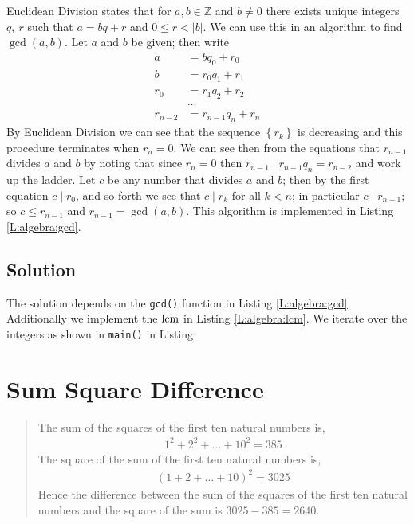 \documentclass[oneside,12pt]{book}   	%
\newcounter{ex}
\newcounter{pr}
\theoremstyle{definition}
\newcommand{\lcm}[1]{\mathrm{lcm }#1}
\newcommand{\set}[1]{\left\{#1\right\}}
\newcommand{\order}[1]{\left| #1 \right|}
\begin{document}
\begin{spacing}{1.618}
			Euclidean Division states that for $a,b\in\mathbb{Z}$ and $b\neq 0$ there exists unique integers $q,~r$ such that $a=bq+r$ and $0\leq r< \order{b}$. We can use this in an algorithm to find $\gcd{(a,b)}$. Let $a$ and $b$ be given; then write 
			\begin{alignat*}{4}
				a&=bq_0+r_0 \\
				b&=r_0q_1+r_1 \\
				r_0&=r_1q_2+r_2 \\
				&\dots \\
				r_{n-2}&=r_{n-1}q_n+r_n
			\end{alignat*}
			By Euclidean Division we can see that the sequence $\set{r_k}$ is decreasing and this procedure terminates when $r_n=0$. We can see then from the equations that $r_{n-1}$ divides $a$ and $b$ by noting that since $r_n=0$ then $r_{n-1}\mid r_{n-1}q_n=r_{n-2}$ and work up the ladder.  Let $c$ be any number that divides $a$ and $b$; then by the first equation $c\mid r_0$, and so forth we see that $c\mid r_k$ for all $k<n$; in particular $c\mid r_{n-1}$; so $c\leq r_{n-1}$ and $r_{n-1}=\gcd{(a,b)}$. This algorithm is implemented in Listing \ref{L:algebra:gcd}. 
			
			
			
		\section{Solution}
		
			
			The solution depends on the \texttt{gcd()} function in Listing \ref{L:algebra:gcd}. Additionally we implement the $\lcm$ in Listing \ref{L:algebra:lcm}. We iterate over the integers as shown in \texttt{main()} in Listing 
			
			
	
	\chapter{Sum Square Difference}
	
		\begin{quote}
			The sum of the squares of the first ten natural numbers is,
			\begin{alignat*}{4}
				1^2+2^2+\dots +10^2 = 385
			\end{alignat*}
			The square of the sum of the first ten natural numbers is,
			\begin{alignat*}{4}
				\left(1+2+\dots +10\right)^2=3025
			\end{alignat*}
			Hence the difference between the sum of the squares of the first ten natural numbers and the square of the sum is $3025-385=2640$.
		

\end{quote}
\end{spacing}
\end{document}
